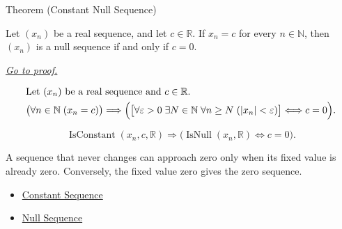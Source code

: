 \begin{theorembox}{Theorem (Constant Null Sequence)}
\begin{theorem}
\label{thm:constant-null-sequence}
Let $(x_n)$ be a real sequence, and let $c \in \mathbb{R}$. If $x_n = c$
for every $n \in \mathbb{N}$, then $(x_n)$ is a null sequence if and only if
$c = 0$.

\smallskip
\noindent
\hyperref[prf:constant-null-sequence]{\textit{Go to proof.}}
\end{theorem}
\end{theorembox}

\begin{remark*}
\[
\begin{aligned}
&\text{Let } (x_n) \text{ be a real sequence and } c \in \mathbb{R}.\\
&\bigl(\forall n \in \mathbb{N}\;(x_n = c)\bigr)
\Longrightarrow
\Bigl(
\bigl[
\forall \varepsilon > 0\;
\exists N \in \mathbb{N}\;
\forall n \ge N\;(|x_n| < \varepsilon)
\bigr]
\Longleftrightarrow c = 0
\Bigr).
\end{aligned}
\]
\end{remark*}

\begin{remark*}
\[
\operatorname{IsConstant}(x_n,c,\mathbb{R})
\Longrightarrow
\bigl(\operatorname{IsNull}(x_n,\mathbb{R}) \Longleftrightarrow c = 0\bigr).
\]
\end{remark*}

\begin{remark*}[Interpretation]
A sequence that never changes can approach zero only when its fixed value is
already zero. Conversely, the fixed value zero gives the zero sequence.
\end{remark*}

\begin{dependencies}
\begin{itemize}
  \item \hyperref[def:constant-sequence]{Constant Sequence}
  \item \hyperref[def:null-sequence]{Null Sequence}
\end{itemize}
\end{dependencies}


